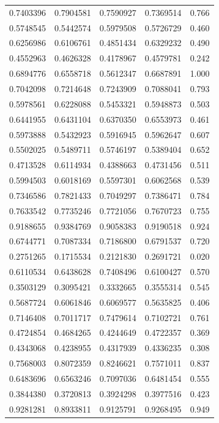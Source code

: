 \documentclass[
  letterpaper,
  DIV=11,
  numbers=noendperiod]{scrartcl}
\begin{document}
\begin{longtable}[]{@{}rrrrr@{}}
0.7403396 & 0.7904581 & 0.7590927 & 0.7369514 & 0.766 \\
0.5748545 & 0.5442574 & 0.5979508 & 0.5726729 & 0.460 \\
0.6256986 & 0.6106761 & 0.4851434 & 0.6329232 & 0.490 \\
0.4552963 & 0.4626328 & 0.4178967 & 0.4579781 & 0.242 \\
0.6894776 & 0.6558718 & 0.5612347 & 0.6687891 & 1.000 \\
0.7042098 & 0.7214648 & 0.7243909 & 0.7088041 & 0.793 \\
0.5978561 & 0.6228088 & 0.5453321 & 0.5948873 & 0.503 \\
0.6441955 & 0.6431104 & 0.6370350 & 0.6553973 & 0.461 \\
0.5973888 & 0.5432923 & 0.5916945 & 0.5962647 & 0.607 \\
0.5502025 & 0.5489711 & 0.5746197 & 0.5389404 & 0.652 \\
0.4713528 & 0.6114934 & 0.4388663 & 0.4731456 & 0.511 \\
0.5994503 & 0.6018169 & 0.5597301 & 0.6062568 & 0.539 \\
0.7346586 & 0.7821433 & 0.7049297 & 0.7386471 & 0.784 \\
0.7633542 & 0.7735246 & 0.7721056 & 0.7670723 & 0.755 \\
0.9188655 & 0.9384769 & 0.9058383 & 0.9190518 & 0.924 \\
0.6744771 & 0.7087334 & 0.7186800 & 0.6791537 & 0.720 \\
0.2751265 & 0.1715534 & 0.2121830 & 0.2691721 & 0.020 \\
0.6110534 & 0.6438628 & 0.7408496 & 0.6100427 & 0.570 \\
0.3503129 & 0.3095421 & 0.3332665 & 0.3555314 & 0.545 \\
0.5687724 & 0.6061846 & 0.6069577 & 0.5635825 & 0.406 \\
0.7146408 & 0.7011717 & 0.7479614 & 0.7102721 & 0.761 \\
0.4724854 & 0.4684265 & 0.4244649 & 0.4722357 & 0.369 \\
0.4343068 & 0.4238955 & 0.4317939 & 0.4336235 & 0.308 \\
0.7568003 & 0.8072359 & 0.8246621 & 0.7571011 & 0.837 \\
0.6483696 & 0.6563246 & 0.7097036 & 0.6481454 & 0.555 \\
0.3844380 & 0.3720813 & 0.3924298 & 0.3977516 & 0.423 \\
0.9281281 & 0.8933811 & 0.9125791 & 0.9268495 & 0.949 \\

\end{longtable}
\end{document}
